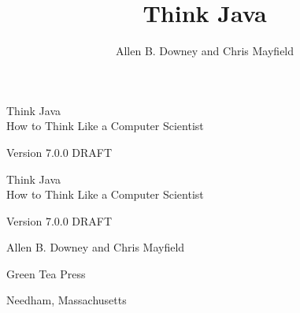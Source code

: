 \documentclass[12pt]{book}
\title{Think Java}
\author{Allen B. Downey and Chris Mayfield}
\newcommand{\thetitle}{Think Java}
\newcommand{\thesubtitle}{How to Think Like a Computer Scientist}
\newcommand{\theauthors}{Allen B. Downey and Chris Mayfield}
\newcommand{\theversion}{7.0.0 DRAFT}
\theoremstyle{exercise}
\newif\ifplastex
\begin{document}
\frontmatter

\ifplastex

\maketitle

\else

\begin{latexonly}

\thispagestyle{empty}

\begin{flushright}
\vspace*{2.0in}

\begin{spacing}{3}
{\huge \thetitle} \\
{\Large \thesubtitle}
\end{spacing}

\vspace{0.25in}

Version \theversion

\vfill
\end{flushright}

\newpage
\thispagestyle{empty}

\quad

\newpage
\thispagestyle{empty}

\begin{flushright}
\vspace*{2.0in}

\begin{spacing}{3}
{\huge \thetitle} \\
{\Large \thesubtitle}
\end{spacing}

\vspace{0.25in}

Version \theversion

\vspace{1in}

{\Large \theauthors}

\vspace{0.5in}

{\Large Green Tea Press}

{\small Needham, Massachusetts}

\vfill
\end{flushright}


\end{latexonly}
\end{document}
